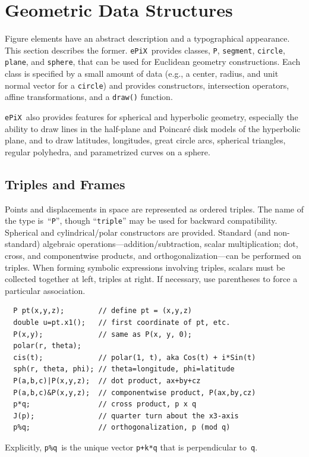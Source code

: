 \documentclass[12pt]{report}
\newcommand{\code}[1]{\texttt{#1}}
\newcommand{\ePiX}{\code{ePiX}}
\begin{document}
\section{Geometric Data Structures}

Figure elements have an abstract description and a typographical
appearance. This section describes the former.  \ePiX\ provides
classes, \code{P}, \code{segment}, \code{circle}, \code{plane}, and
\code{sphere}, that can be used for Euclidean geometry constructions.
Each class is specified by a small amount of data (e.g., a center,
radius, and unit normal vector for a \code{circle}) and provides
constructors, intersection operators, affine transformations, and a
\code{draw()} function.

\ePiX\ also provides features for spherical and hyperbolic geometry,
especially the ability to draw lines in the half-plane and Poincar\'e
disk models of the hyperbolic plane, and to draw latitudes,
longitudes, great circle arcs, spherical triangles, regular polyhedra,
and parametrized curves on a sphere.


\subsection*{Triples and Frames}

Points and displacements in space are represented as ordered triples.
The name of the type is~``\code{P}'', though ``\code{triple}'' may
be used for backward compatibility. Spherical and cylindrical/polar
constructors are provided. Standard (and non-standard) algebraic
operations---addition/subtraction, scalar multiplication; dot, cross,
and componentwise products, and orthogonalization---can be performed
on triples.  When forming symbolic expressions involving triples,
scalars must be collected together at left, triples at right. If
necessary, use parentheses to force a particular association.
\begin{verbatim}
  P pt(x,y,z);        // define pt = (x,y,z)
  double u=pt.x1();   // first coordinate of pt, etc.
  P(x,y);             // same as P(x, y, 0);
  polar(r, theta);
  cis(t);             // polar(1, t), aka Cos(t) + i*Sin(t)
  sph(r, theta, phi); // theta=longitude, phi=latitude
  P(a,b,c)|P(x,y,z);  // dot product, ax+by+cz
  P(a,b,c)&P(x,y,z);  // componentwise product, P(ax,by,cz)
  p*q;                // cross product, p x q
  J(p);               // quarter turn about the x3-axis
  p%q;                // orthogonalization, p (mod q)
\end{verbatim}
Explicitly, \code{p\%q}~is the unique vector \code{p+k*q} that is
perpendicular to~\code{q}.
\end{document}
